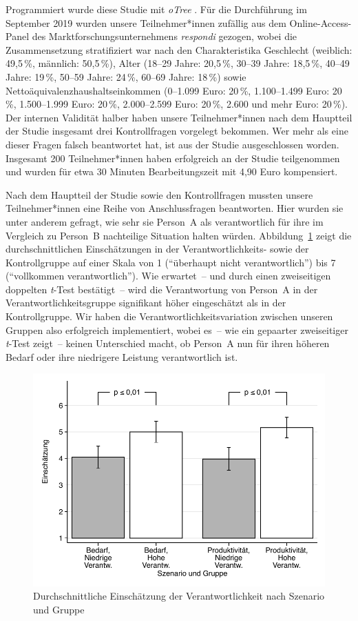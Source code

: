 \documentclass[justified,nobib,nohyper,symmetric,twoside]{tufte-book}
\begin{document}
Programmiert wurde diese Studie mit \textit{oTree} \citep{chen_otree_2016}.
Für die Durchführung im September 2019 wurden unsere Teilnehmer*innen zufällig aus dem Online-Access-Panel des Marktforschungsunternehmens \textit{respondi} gezogen, wobei die Zusammensetzung stratifiziert war nach den Charakteristika Geschlecht (weiblich: 49,5\,\%, männlich: 50,5\,\%), Alter (18--29 Jahre: 20,5\,\%, 30--39 Jahre: 18,5\,\%, 40--49 Jahre: 19\,\%, 50--59 Jahre: 24\,\%, 60--69 Jahre: 18\,\%) sowie Nettoäquivalenzhaushaltseinkommen (0--1.099 Euro: 20\,\%, 1.100--1.499 Euro: 20\,\%, 1.500--1.999 Euro: 20\,\%, 2.000--2.599 Euro: 20\,\%, 2.600 und mehr Euro: 20\,\%).
Der internen Validität halber haben unsere Teilnehmer*innen nach dem Hauptteil der Studie insgesamt drei Kontrollfragen vorgelegt bekommen.
Wer mehr als eine dieser Fragen falsch beantwortet hat, ist aus der Studie ausgeschlossen worden.
Insgesamt 200 Teilnehmer*innen haben erfolgreich an der Studie teilgenommen und wurden für etwa 30 Minuten Bearbeitungszeit mit 4,90 Euro kompensiert.

Nach dem Hauptteil der Studie sowie den Kontrollfragen mussten unsere Teilnehmer*innen eine Reihe von Anschlussfragen beantworten.
Hier wurden sie unter anderem gefragt, wie sehr sie Person~A als verantwortlich für ihre im Vergleich zu Person~B nachteilige Situation halten würden.
Abbildung~\ref{fig:abbildung_6} zeigt die durchschnittlichen Einschätzungen in der Verantwortlichkeits- sowie der Kontrollgruppe auf einer Skala von 1 (\enquote{überhaupt nicht verantwortlich}) bis 7 (\enquote{vollkommen verantwortlich}).
Wie erwartet~-- und durch einen zweiseitigen doppelten \textit{t}-Test bestätigt~-- wird die Verantwortung von Person~A in der Verantwortlichkeitsgruppe signifikant höher eingeschätzt als in der Kontrollgruppe.
Wir haben die Verantwortlichkeitsvariation zwischen unseren Gruppen also erfolgreich implementiert, wobei es~-- wie ein gepaarter zweiseitiger \textit{t}-Test zeigt~-- keinen Unterschied macht, ob Person~A nun für ihren höheren Bedarf oder ihre niedrigere Leistung verantwortlich ist.

\begin{figure}[t]\label{fig:abbildung_6}
   \center
   \includegraphics[width=0.99\linewidth]{figure_6.pdf}
   \caption{Durchschnittli\-che Einschätzung der Verantwortlichkeit nach Szenario und Gruppe}
\end{figure}
\end{document}
